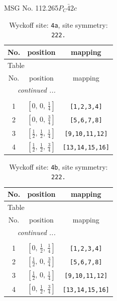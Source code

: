 \documentclass[fleqn,8pt]{jsarticle}
\begin{document}
\setcounter{MaxMatrixCols}{32}

\renewcommand{\tablename}{Table~}
\renewcommand{\figurename}{Figure~}
\begin{center}
\LARGE
MSG No. 112.265\quad$P_{C}\bar{4}2c$
\end{center}
\renewcommand{\arraystretch}{1.2}
\begin{longtable}{ccc}
\caption{Wyckoff site: {\tt 4a}, site symmetry: {\tt 222.}}
 \\
 \hline \hline
No. & position & mapping \\ \hline \endfirsthead

\multicolumn{2}{l}{\tablename\ \thetable{}} \\
 \hline \hline
No. & position & mapping \\ \hline \endhead

 \hline \hline
\multicolumn{2}{r}{\footnotesize\it continued ...} \\ \endfoot

 \hline \hline
\multicolumn{2}{r}{} \\ \endlastfoot

1 & $\left[ 0,\, 0,\, \frac{1}{4} \right]$ & {\tt [1,2,3,4]} \\ \hline
2 & $\left[ 0,\, 0,\, \frac{3}{4} \right]$ & {\tt [5,6,7,8]} \\ \hline
3 & $\left[ \frac{1}{2},\, \frac{1}{2},\, \frac{1}{4} \right]$ & {\tt [9,10,11,12]} \\ \hline
4 & $\left[ \frac{1}{2},\, \frac{1}{2},\, \frac{3}{4} \right]$ & {\tt [13,14,15,16]} \\
\end{longtable}
\renewcommand{\arraystretch}{1.2}
\begin{longtable}{ccc}
\caption{Wyckoff site: {\tt 4b}, site symmetry: {\tt 222.}}
 \\
 \hline \hline
No. & position & mapping \\ \hline \endfirsthead

\multicolumn{2}{l}{\tablename\ \thetable{}} \\
 \hline \hline
No. & position & mapping \\ \hline \endhead

 \hline \hline
\multicolumn{2}{r}{\footnotesize\it continued ...} \\ \endfoot

 \hline \hline
\multicolumn{2}{r}{} \\ \endlastfoot

1 & $\left[ 0,\, \frac{1}{2},\, \frac{1}{4} \right]$ & {\tt [1,2,3,4]} \\ \hline
2 & $\left[ \frac{1}{2},\, 0,\, \frac{3}{4} \right]$ & {\tt [5,6,7,8]} \\ \hline
3 & $\left[ \frac{1}{2},\, 0,\, \frac{1}{4} \right]$ & {\tt [9,10,11,12]} \\ \hline
4 & $\left[ 0,\, \frac{1}{2},\, \frac{3}{4} \right]$ & {\tt [13,14,15,16]} \\
\end{longtable}
\end{document}
